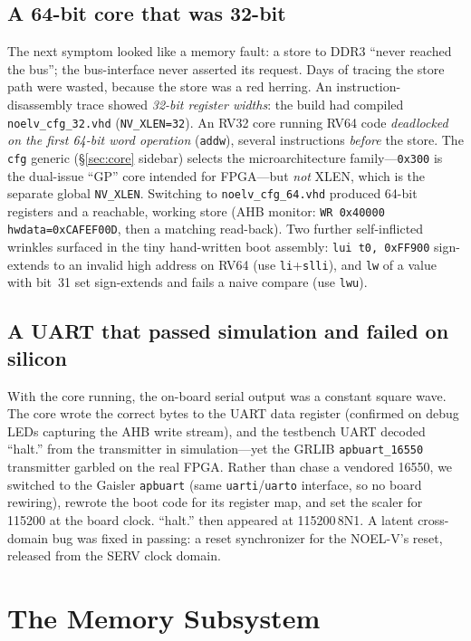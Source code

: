 \documentclass[conference,nofonttune]{IEEEtran}
\newcommand{\code}[1]{\texttt{#1}}
\newcommand{\reg}[1]{\texttt{#1}}
\begin{document}
\subsection{A 64-bit core that was 32-bit}
The next symptom looked like a memory fault: a store to DDR3 ``never reached the
bus''; the bus-interface never asserted its request. Days of tracing the store
path were wasted, because the store was a red herring. An instruction-disassembly
trace showed \emph{32-bit register widths}: the build had compiled
\code{noelv\_cfg\_32.vhd} (\code{NV\_XLEN=32}). An RV32 core running RV64 code
\emph{deadlocked on the first 64-bit word operation} (\code{addw}), several
instructions \emph{before} the store. The \code{cfg} generic (\S\ref{sec:core}
sidebar) selects the microarchitecture family---\code{0x300} is the dual-issue
``GP'' core intended for FPGA---but \emph{not} XLEN, which is the separate global
\code{NV\_XLEN}. Switching to \code{noelv\_cfg\_64.vhd} produced 64-bit registers
and a reachable, working store (AHB monitor: \code{WR 0x40000 hwdata=0xCAFEF00D},
then a matching read-back). Two further self-inflicted wrinkles surfaced in the
tiny hand-written boot assembly: \code{lui t0, 0xFF900} sign-extends to an
invalid high address on RV64 (use \code{li}+\code{slli}), and \code{lw} of a
value with bit~31 set sign-extends and fails a naive compare (use \code{lwu}).

\subsection{A UART that passed simulation and failed on silicon}
With the core running, the on-board serial output was a constant square wave.
The core wrote the correct bytes to the UART data register (confirmed on
debug LEDs capturing the AHB write stream), and the testbench UART decoded
``halt.'' from the transmitter in simulation---yet the GRLIB \code{apbuart\_16550}
transmitter garbled on the real FPGA. Rather than chase a vendored 16550, we
switched to the Gaisler \code{apbuart} (same \reg{uarti}/\reg{uarto} interface, so
no board rewiring), rewrote the boot code for its register map, and set the
scaler for 115200 at the board clock. ``halt.'' then appeared at 115200\,8N1. A
latent cross-domain bug was fixed in passing: a reset synchronizer for the
NOEL-V's reset, released from the SERV clock domain.

\section{The Memory Subsystem}
\label{sec:mem}
\end{document}
